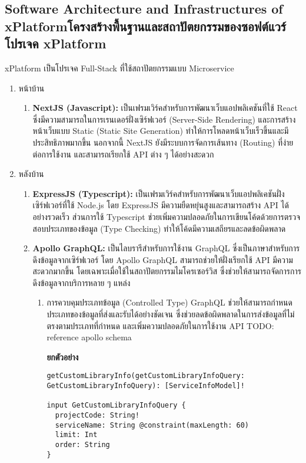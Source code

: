 \subsection{\ifenglish Software Architecture and Infrastructures of xPlatform\else โครงสร้างพื้นฐานและสถาปัตยกรรมของซอฟต์แวร์โปรเจค xPlatform\fi}
xPlatform เป็นโปรเจค Full-Stack ที่ใช้สถาปัตยกรรมแบบ Microservice
\begin{enumerate}
    \item หน้าบ้าน
    \begin{enumerate}
        \item \textbf{NextJS (Javascript):} เป็นเฟรมเวิร์คสำหรับการพัฒนาเว็บแอปพลิเคชันที่ใช้ React ซึ่งมีความสามารถในการเรนเดอร์ฝั่งเซิร์ฟเวอร์ (Server-Side Rendering) และการสร้างหน้าเว็บแบบ Static (Static Site Generation) ทำให้การโหลดหน้าเว็บเร็วขึ้นและมีประสิทธิภาพมากขึ้น นอกจากนี้ NextJS ยังมีระบบการจัดการเส้นทาง (Routing) ที่ง่ายต่อการใช้งาน และสามารถเรียกใช้ API ต่าง ๆ ได้อย่างสะดวก
    \end{enumerate}
    \item หลังบ้าน
    \begin{enumerate}
        \item \textbf{ExpressJS (Typescript):} เป็นเฟรมเวิร์คสำหรับการพัฒนาเว็บแอปพลิเคชันฝั่งเซิร์ฟเวอร์ที่ใช้ Node.js โดย ExpressJS มีความยืดหยุ่นสูงและสามารถสร้าง API ได้อย่างรวดเร็ว ส่วนการใช้ Typescript ช่วยเพิ่มความปลอดภัยในการเขียนโค้ดด้วยการตรวจสอบประเภทของข้อมูล (Type Checking) ทำให้โค้ดมีความเสถียรและลดข้อผิดพลาด
        \item \textbf{Apollo GraphQL:} เป็นไลบรารีสำหรับการใช้งาน GraphQL ซึ่งเป็นภาษาสำหรับการดึงข้อมูลจากเซิร์ฟเวอร์ โดย Apollo GraphQL สามารถช่วยให้ฝั่งเรียกใช้ API มีความสะดวกมากขึ้น โดยเฉพาะเมื่อใช้ในสถาปัตยกรรมไมโครเซอร์วิส ซึ่งช่วยให้สามารถจัดการการดึงข้อมูลจากบริการหลาย ๆ แหล่ง
        \begin{enumerate}
            \item การควบคุมประเภทข้อมูล (Controlled Type) GraphQL ช่วยให้สามารถกำหนดประเภทของข้อมูลที่ส่งและรับได้อย่างชัดเจน ซึ่งช่วยลดข้อผิดพลาดในการส่งข้อมูลที่ไม่ตรงตามประเภทที่กำหนด และเพิ่มความปลอดภัยในการใช้งาน API TODO: reference apollo schema
            
            \textbf{ยกตัวอย่าง}
            \begin{center}                
                \begin{lstlisting}
getCustomLibraryInfo(getCustomLibraryInfoQuery: GetCustomLibraryInfoQuery): [ServiceInfoModel]!

input GetCustomLibraryInfoQuery {
  projectCode: String!
  serviceName: String @constraint(maxLength: 60)
  limit: Int
  order: String
}


\end{lstlisting}
\end{center}
\end{enumerate}
\end{enumerate}
\end{enumerate}
